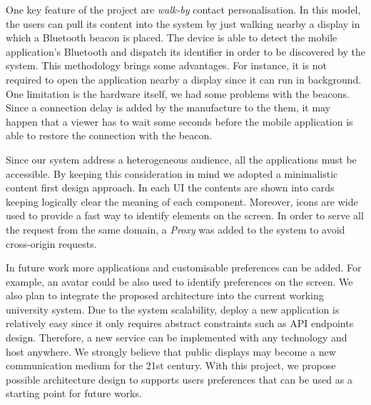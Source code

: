 \documentclass[]{usiinfbachelorproject}
\begin{document}
One key feature of the project are \emph{walk-by} contact personalisation. In this model, the users can pull its content into the system by just walking nearby a display in which a Bluetooth beacon is placed. The device is able to detect the mobile application's Bluetooth and dispatch its identifier in order to be discovered by the system. This methodology brings some advantages. For instance, it is not required to open the application nearby a display since it can run in background. 
One limitation is the hardware itself, we had some problems with the beacons. Since a connection delay is added by the manufacture to the them, it may happen that a viewer has to wait some seconds before the mobile application is able to restore the connection with the beacon.

Since our system address a heterogeneous audience, all the applications must be accessible. By keeping this consideration in mind we adopted a minimalistic content first design approach. In each UI the contents are shown into cards keeping logically clear the meaning of each component. Moreover, icons are wide used to provide a fast way to identify elements on the screen. In order to serve all the request from the same domain, a \emph{Proxy} was added to the system to avoid cross-origin requests.

In future work more applications and customisable preferences can be added. For example, an avatar could be also used to identify preferences on the screen. We also plan to integrate the proposed architecture into the current working university system. Due to the system scalability, deploy a new application is relatively easy since it only requires abstract constraints such as API endpoints design. Therefore, a new service can be implemented with any technology and host anywhere. We strongly believe that public displays may become a new communication medium for the 21st century. With this project, we propose possible architecture design to supports users preferences that can be used as a starting point for future works.

%
%
%

\newpage


\end{document}
